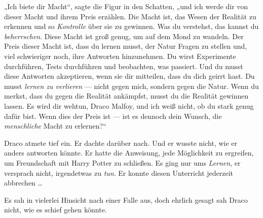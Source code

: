 „Ich biete dir Macht“, sagte die Figur in den Schatten, „und ich werde dir von dieser Macht und ihrem Preis erzählen. Die Macht ist, das Wesen der Realität zu erkennen und so \emph{Kontrolle} über sie zu gewinnen. Was du verstehst, das kannst du \emph{beherrschen}. Diese Macht ist groß genug, um auf dem Mond zu wandeln. Der Preis dieser Macht ist, dass du lernen musst, der Natur Fragen zu stellen und, viel schwieriger noch, ihre Antworten hinzunehmen. Du wirst Experimente durchführen, Tests durchführen und beobachten, was passiert. Und du musst diese Antworten akzeptieren, wenn sie dir mitteilen, dass du dich geirrt hast. Du musst \emph{lernen zu verlieren} — nicht gegen mich, sondern gegen die Natur. Wenn du merkst, dass du gegen die Realität ankämpfst, musst du die Realität gewinnen lassen. Es wird dir wehtun, Draco Malfoy, und ich weiß nicht, ob du stark genug dafür bist. Wenn dies der Preis ist — ist es dennoch dein Wunsch, die \emph{menschliche} Macht zu erlernen?“

Draco atmete tief ein. Er dachte darüber nach. Und er wusste nicht, wie er anders antworten könnte. Er hatte die Anweisung, jede Möglichkeit zu ergreifen, um Freundschaft mit Harry Potter zu schließen. Es ging nur ums \emph{Lernen}, er versprach nicht, irgendetwas zu \emph{tun}. Er konnte diesen Unterricht jederzeit abbrechen …

Es sah in vielerlei Hinsicht nach einer Falle aus, doch ehrlich gesagt sah Draco nicht, wie es schief gehen könnte.

